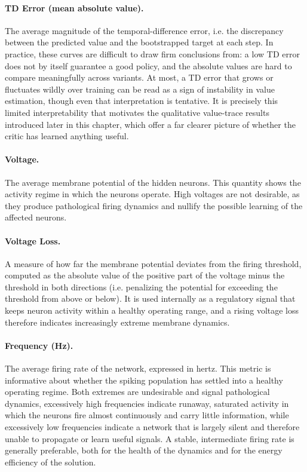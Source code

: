 \paragraph{TD Error (mean absolute value).} The average magnitude of the temporal-difference 
error, i.e. the discrepancy between the predicted value and the bootstrapped target at each step. 
In practice, these curves are difficult to draw firm conclusions from: a low TD error does not by 
itself guarantee a good policy, and the absolute values are hard to compare meaningfully across 
variants. At most, a TD error that grows or fluctuates wildly over training can be read as a sign 
of instability in value estimation, though even that interpretation is tentative. It is precisely 
this limited interpretability that motivates the qualitative value-trace results introduced later 
in this chapter, which offer a far clearer picture of whether the critic has learned anything useful.

\paragraph{Voltage.} The average membrane potential of the hidden neurons. This quantity 
shows the activity regime in which the neurons operate. High voltages are not desirable, as 
they produce pathological firing dynamics and nullify the possible learning of the affected 
neurons.
    
\paragraph{Voltage Loss.} A measure of how far the membrane potential deviates from the 
firing threshold, computed as the absolute value of the positive part of the 
voltage minus the threshold in both directions (i.e. 
penalizing the potential for exceeding the threshold from above or below). It is used 
internally as a regulatory signal that keeps neuron activity within a healthy operating range, 
and a rising voltage loss therefore indicates increasingly extreme membrane dynamics.

\paragraph{Frequency (Hz).} The average firing rate of the network, expressed in hertz. This 
metric is informative about whether the spiking population has settled into a healthy operating 
regime. Both extremes are undesirable and signal pathological dynamics, excessively high 
frequencies indicate runaway, saturated activity in which the neurons fire almost continuously and 
carry little information, while excessively low frequencies indicate a network that is largely 
silent and therefore unable to propagate or learn useful signals. A stable, intermediate firing 
rate is generally preferable, both for the health of the dynamics and for the energy efficiency 
of the solution.

